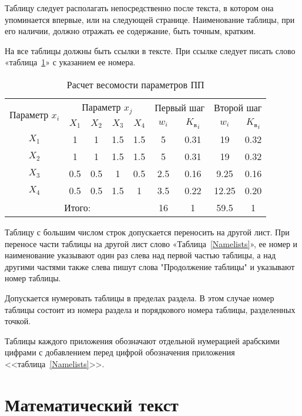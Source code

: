 \documentclass[14pt]{extreport}
\begin{document}
Таблицу следует располагать непосредственно после текста, в котором она упоминается впервые, или на следующей странице.
Наименование таблицы, при его наличии, должно отражать ее содержание, быть точным, кратким. 

На все таблицы должны быть ссылки в тексте. При ссылке следует писать слово «таблица~\ref{tab_weight}» с указанием ее номера.

\begin{table}[H]
\caption{Расчет весомости параметров ПП}
\label{tab_weight}
\centering
    \begin{tabular}{|c|c|c|c|c|c|c|c|c|}
    \hline \multirow{2}{*}{Параметр $x_i$} & \multicolumn{4}{c|}{Параметр $x_j$} & 
        \multicolumn{2}{c|}{Первый шаг} & \multicolumn{2}{c|}{Второй шаг} \\
    \cline{2-9} & $X_1$ & $X_2$ & $X_3$ & $X_4$ & $w_i$ & 
        ${K_\text{в}}_i$ & $w_i$ & ${K_\text{в}}_i$ \\
    \hline $X_1$ & 1 & 1 & 1.5 & 1.5 & 5 & 0.31 & 19 & 0.32 \\
    \hline $X_2$ & 1 & 1 & 1.5 & 1.5 & 5 & 0.31 & 19 & 0.32 \\
    \hline $X_3$ & 0.5 & 0.5 & 1 & 0.5 & 2.5 & 0.16 & 9.25 & 0.16 \\
    \hline $X_4$ & 0.5 & 0.5 & 1.5 & 1 & 3.5 & 0.22 & 12.25 & 0.20 \\
    \hline \multicolumn{5}{|c|}{Итого:} & 16 & 1 & 59.5 & 1 \\
    \hline
    \end{tabular}
\end{table}

Таблицу с большим числом строк допускается переносить на другой лист. При
переносе части таблицы на другой лист слово «Таблица~\ref{Namelists}», ее номер и наименование
указывают один раз слева над первой частью таблицы, а над другими частями также
слева пишут слова "Продолжение таблицы" и указывают номер таблицы.

Допускается нумеровать таблицы в пределах раздела. В этом случае номер таблицы
состоит из номера раздела и порядкового номера таблицы, разделенных точкой.

Таблицы каждого приложения обозначают отдельной нумерацией арабскими цифрами с
добавлением перед цифрой обозначения приложения <<таблица~\ref{Namelists}>>. 

\chapter{Математический текст}
\end{document}
